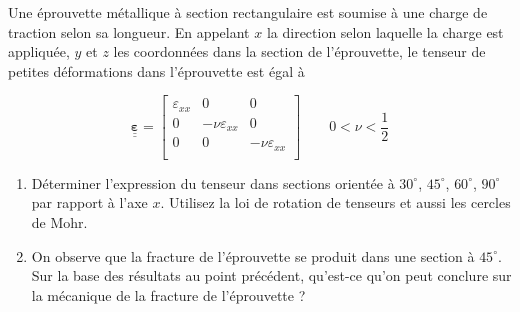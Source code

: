 \documentclass
[
a4paper,                      %
twoside,					  %
12pt,                         %
abstract,		      %
fleqn,                        %
]
{scrartcl} %
\begin{document}
Une \'eprouvette m\'etallique \`a section rectangulaire est soumise \`a une charge de traction selon sa longueur. En appelant $x$ la direction selon laquelle la charge est appliqu\'ee, $y$ et $z$ les coordonn\'ees dans la section de l'\'eprouvette, le tenseur de petites d\'eformations dans l'\'eprouvette est \'egal \`a

\begin{equation}
\mathbf{\underline{\underline{\varepsilon}}}=\begin{bmatrix}
\varepsilon_{xx}&0&0\\
0&-\nu\varepsilon_{xx}&0\\
0&0&-\nu\varepsilon_{xx}\\
\end{bmatrix}\qquad0<\nu<\frac{1}{2}
\end{equation}

\begin{enumerate}
\item D\'eterminer l'expression du tenseur dans sections orient\'ee \`a $30^{\circ}$, $45^{\circ}$, $60^{\circ}$, $90^{\circ}$ par rapport \`a l'axe $x$. Utilisez la loi de rotation de tenseurs et aussi les cercles de Mohr. 
\item On observe que la fracture de l'\'eprouvette se produit dans une section \`a $45^{\circ}$. Sur la base des r\'esultats au point pr\'ec\'edent, qu'est-ce qu'on peut conclure sur la m\'ecanique de la fracture de l'\'eprouvette ? 
\end{enumerate}



%


%
%
%


%
%
\end{document}
